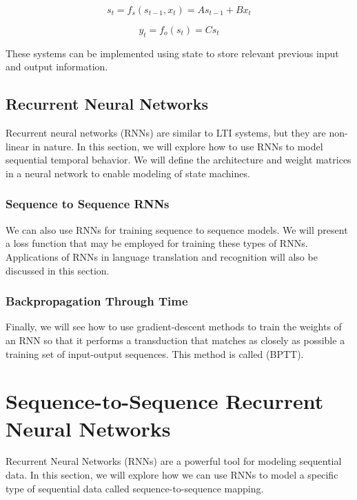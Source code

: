     \begin{equation}
    s_t = f_s(s_{t-1}, x_t) = A s_{t-1} + B x_t
    \end{equation}
    
    \begin{equation}
    y_t = f_o(s_t) = C s_t
    \end{equation}
    
    These systems can be implemented using state to store relevant previous input and output information.
    
    \subsection{Recurrent Neural Networks}
    
    Recurrent neural networks (RNNs) are similar to LTI systems, but they are non-linear in nature. In this section, we will explore how to use RNNs to model sequential temporal behavior. We will define the architecture and weight matrices in a neural network to enable modeling of state machines.
    
    \subsubsection{Sequence to Sequence RNNs}
    
    We can also use RNNs for training sequence to sequence models. We will present a loss function that may be employed for training these types of RNNs. Applications of RNNs in language translation and recognition will also be discussed in this section.
    
    \subsubsection{Backpropagation Through Time}
    
    Finally, we will see how to use gradient-descent methods to train the weights of an RNN so that it performs a transduction that matches as closely as possible a training set of input-output sequences. This method is called  (BPTT).

\section{Sequence-to-Sequence Recurrent Neural Networks}
    \label{sec:seq2seq_rnn}
    
    Recurrent Neural Networks (RNNs) are a powerful tool for modeling sequential data. In this section, we will explore how we can use RNNs to model a specific type of sequential data called sequence-to-sequence mapping.
    
